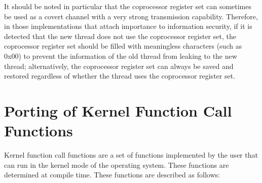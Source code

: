It should be noted in particular that the coprocessor register set can sometimes be used as a covert channel with a very strong transmission capability. Therefore, in those implementations that attach importance to information security, if it is detected that the new thread does not use the coprocessor register set, the coprocessor register set should be filled with meaningless characters (such as 0x00) to prevent the information of the old thread from leaking to the new thread; alternatively, the coprocessor register set can always be saved and restored regardless of whether the thread uses the coprocessor register set.

\newpage
\section{Porting of Kernel Function Call Functions}\label{sec:7-kernel-function-call-function-porting}

Kernel function call functions are a set of functions implemented by the user that can run in the kernel mode of the operating system. These functions are determined at compile time. These functions are described as follows:

